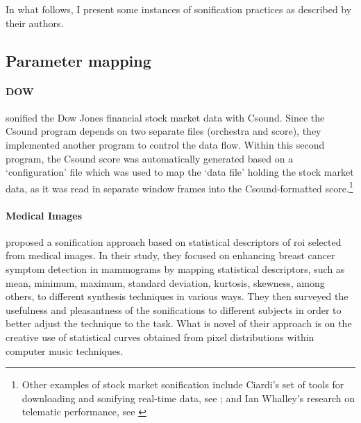 In what follows, I present some instances of sonification practices as described by their authors.

\subsection{Parameter mapping}
\label{sonification:parametermapping}

\paragraph{DOW}
\textcite{icmc/bbp2372.1996.085} sonified the Dow Jones financial stock market data with Csound. Since the Csound program depends on two separate files (orchestra and score), they implemented another program to control the data flow. Within this second program, the Csound score was automatically generated based on a `configuration' file which was used to map the `data file' holding the stock market data, as it was read in separate window frames into the Csound-formatted score.\footnote{Other examples of stock market sonification include Ciardi's set of tools for downloading and sonifying real-time data, see \textcite{icmc/bbp2372.2004.124}; and Ian Whalley's research on telematic performance, see \textcite{icmc/bbp2372.2014.046}}

\paragraph{Medical Images}
\textcite{DBLP:conf/icmc/CadizCMMATI15} proposed a sonification approach based on statistical descriptors of \gls{roi} selected from medical images. In their study, they focused on enhancing breast cancer symptom detection in mammograms by mapping statistical descriptors, such as mean, minimum, maximum, standard deviation, kurtosis, skewness, among others, to different synthesis techniques in various ways. They then surveyed the usefulness and pleasantness of the sonifications to different subjects in order to better adjust the technique to the task. What is novel of their approach is on the creative use of statistical curves obtained from pixel distributions within computer music techniques.


